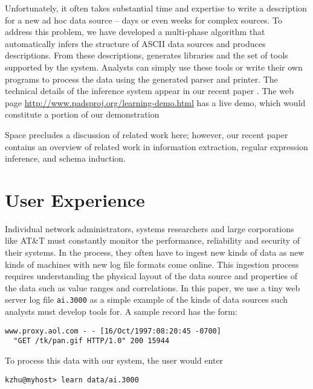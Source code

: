 \documentclass[preprint]{sig-alternate-sigmod08}
\begin{document}
Unfortunately, it often takes substantial time and expertise to write
a \pads{} description for a new ad hoc data source -- days or even
weeks for complex sources.  To address this problem, we have developed
a multi-phase algorithm that automatically infers the structure of
ASCII data sources and produces \pads{} descriptions.  From these
descriptions, \learnpads{} generates libraries and the set of tools
supported by the \pads{} system.  Analysts can simply use these tools
or write their own programs to process the data using the generated
parser and printer.  The technical details of the inference system 
appear in our recent paper
\cite{Fisher+:dirttoshovels}.  The web page
\url{http://www.padsproj.org/learning-demo.html} has a live
demo, which would constitute a portion of our demonstration

Space precludes a discussion of related work here; however, our recent
paper~\cite{Fisher+:dirttoshovels} contains an overview of related
work in information extraction, regular expression inference, and
schema induction.  

\section{User Experience}

Individual network administrators, systems researchers and large 
corporations like AT\&T must constantly monitor the performance,
reliability and security of their systems.
In the process, they often have to ingest new kinds of data
as new kinds of machines with new log file formats come
online.  This ingestion process requires understanding the physical
layout of the data source and properties of the data such as value
ranges and correlations.  In this paper, we use a tiny
web server log file {\tt ai.3000} as a simple example of the kinds of
data sources such analysts must develop tools for. A sample record has
the form:

{\small
\begin{verbatim}
www.proxy.aol.com - - [16/Oct/1997:08:20:45 -0700] 
  "GET /tk/pan.gif HTTP/1.0" 200 15944
\end{verbatim}
}

\noindent
To process this data with our system, the user would enter


{\small
\begin{verbatim}
kzhu@myhost> learn data/ai.3000 
\end{verbatim}
}
\end{document}
